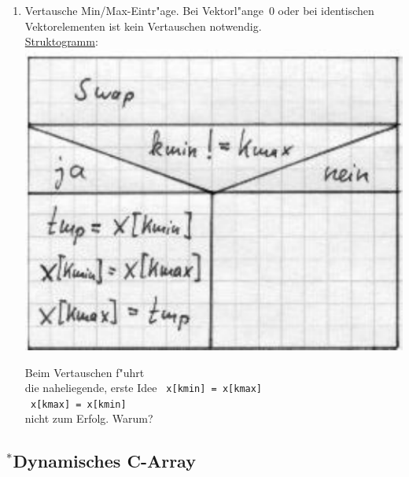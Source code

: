 \begin{enumerate}
%
 \item Vertausche Min/Max-Eintr"age. Bei Vektorl"ange~$0$ oder
 	bei identischen Vektorelementen ist kein Vertauschen notwendig.
\\
%
\underline{Struktogramm}: \\
\includegraphics[scale=0.7]{GIF/p49b}
%
\hfill
\begin{minipage}[b]{0.35\textwidth}
Beim Vertauschen f"uhrt \\
die naheliegende, erste Idee
\verb| x[kmin] = x[kmax]| \\
\verb| x[kmax] = x[kmin]| \\
nicht zum Erfolg. Warum?
\end{minipage}
%
\end{enumerate}
%
%
%
%
%
\subsection{\mbox{}$^{*}$Dynamisches C-Array}
\label{sec:5.1.4}
%
%
%
